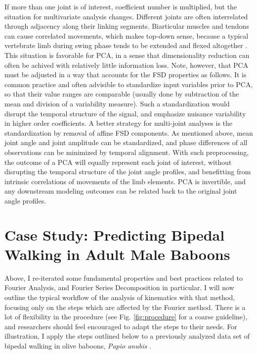 If more than one joint is of interest, coefficient number is multiplied, but the situation for multivariate analysis changes.
Different joints are often interrelated through adjacency along their linking segments.
Biarticular muscles and tendons can cause correlated movements, which makes top-down sense, because a typical vertebrate limb during swing phase tends to be extended and flexed altogether \citep{Fischer2006}.
This situation is favorable for PCA, in a sense that dimensionality reduction can often be achived with relatively little information loss.
Note, however, that PCA must be adjusted in a way that accounts for the FSD properties as follows.
It is common practice and often advisible to standardize input variables prior to PCA, so that their value ranges are comparable (usually done by subtraction of the mean and division of a variability measure).
Such a standardization would disrupt the temporal structure of the signal, and emphasize nuisance variability in higher order coefficients.
A better strategy for multi-joint analyses is the standardization by removal of affine FSD components.
As mentioned above, mean joint angle and joint amplitude can be standardized, and phase differences of all observations can be minimized by temporal alignment.
With such preprocessing, the outcome of a PCA will equally represent each joint of interest, without disrupting the temporal structure of the joint angle profiles, and benefitting from intrinsic correlations of movements of the limb elements.
PCA is invertible, and any downstream modeling outcomes can be related back to the original joint angle profiles.

\FloatBarrier\clearpage
\section{Case Study: Predicting Bipedal Walking in Adult Male Baboons}
\label{casestudy}
Above, I re-iterated some fundamental properties and best practices related to Fourier Analysis, and Fourier Series Decomposition in particular.
I will now outline the typical workflow of the analysis of kinematics with that method, focusing only on the steps which are affected by the Fourier method.
There is a lot of flexibility in the procedure (see Fig. \ref{fig:procedure} for a coarse guideline), and researchers should feel encouraged to adapt the steps to their needs.
For illustration, I apply the steps outlined below to a previously analyzed data set of bipedal walking in olive baboons, \emph{Papio anubis} \citep{Druelle2021}.

